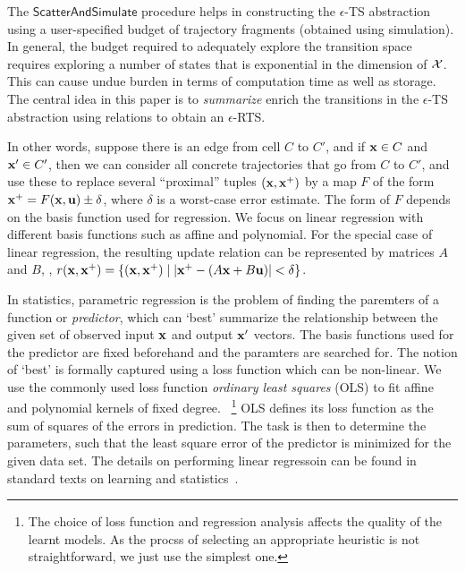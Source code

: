 The $\mathsf{ScatterAndSimulate}$ procedure helps in constructing the
$\epsilon$-TS abstraction using a user-specified budget of trajectory
fragments (obtained using simulation).  In general, the budget
required to adequately explore the transition space requires exploring
a number of states that is exponential in the dimension of
$\mathcal{X}$.  This can cause undue burden in terms of computation
time as well as storage.  The central idea in this paper is to {\em
summarize} enrich the transitions in the $\epsilon$-TS abstraction
using relations to obtain an $\epsilon$-RTS.

In other words, suppose there is an edge from cell $C$ to $C'$, and if
$\mathbf{x} \in C$ and $\mathbf{x}' \in C'$, then we can consider all concrete
trajectories that go from $C$ to $C'$, and use these to replace
several ``proximal'' tuples $(\mathbf{x},\mathbf{x}^{+})$ by a map $F$ of the form
$\mathbf{x}^{+} = F(\mathbf{x}, \mathbf{u}) \pm \delta$, where $\delta$ is a worst-case error
estimate. The form of $F$ depends on the basis function used for
regression. We focus on linear regression with different basis
functions such as affine and polynomial. For the special case of
linear regression, the resulting update relation can be represented by
matrices $A$ and $B$, \ie, $r(\mathbf{x},\mathbf{x}^{+}) = \{(\mathbf{x},\mathbf{x}^{+}) \mid |\mathbf{x}^{+}
- (A\mathbf{x} + B\mathbf{u})| < \delta\}$.

In statistics, parametric regression is the problem of finding the
paremters of a function or \textit{predictor}, which can `best'
summarize the relationship between the given set of observed input
$\mathbf{x}$ and output $\mathbf{x}'$ vectors. The basis functions used for the
predictor are fixed beforehand and the paramters are searched for.
The notion of `best' is formally captured using a loss function which
can be non-linear. We use the commonly used loss function
\textit{ordinary least squares} (OLS) to fit affine and polynomial
kernels of fixed degree.  ~\footnote{The choice of loss function and
regression analysis affects the quality of the learnt models. As the
procss of selecting an appropriate heuristic is not straightforward,
we just use the simplest one.} OLS defines its loss function as the
sum of squares of the errors in prediction. The task is then to
determine the parameters, such that the least square error of the
predictor is minimized for the given data set.  The details on
performing linear regressoin can be found in standard texts on
learning and statistics~\cite{friedman2001elements}.



